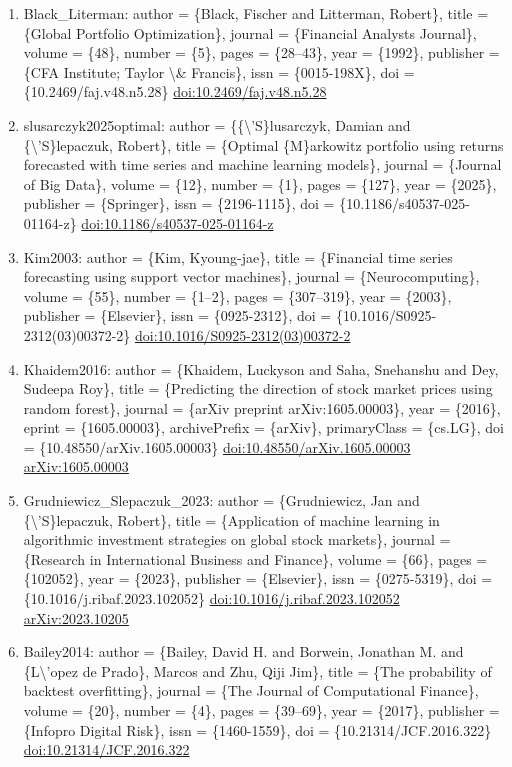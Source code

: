 \documentclass[11pt]{article}
\begin{document}
\begin{enumerate}[leftmargin=*]
  \item Black\_Literman: author = \{Black, Fischer and Litterman, Robert\}, title = \{Global Portfolio Optimization\}, journal = \{Financial Analysts Journal\}, volume = \{48\}, number = \{5\}, pages = \{28--43\}, year = \{1992\}, publisher = \{CFA Institute; Taylor \textbackslash{}\& Francis\}, issn = \{0015-198X\}, doi = \{10.2469/faj.v48.n5.28\} \href{https://doi.org/10.2469/faj.v48.n5.28}{doi:10.2469/faj.v48.n5.28}
  \item slusarczyk2025optimal: author = \{\{\textbackslash{}'S\}lusarczyk, Damian and \{\textbackslash{}'S\}lepaczuk, Robert\}, title = \{Optimal \{M\}arkowitz portfolio using returns forecasted with time series and machine learning models\}, journal = \{Journal of Big Data\}, volume = \{12\}, number = \{1\}, pages = \{127\}, year = \{2025\}, publisher = \{Springer\}, issn = \{2196-1115\}, doi = \{10.1186/s40537-025-01164-z\} \href{https://doi.org/10.1186/s40537-025-01164-z}{doi:10.1186/s40537-025-01164-z}
  \item Kim2003: author = \{Kim, Kyoung-jae\}, title = \{Financial time series forecasting using support vector machines\}, journal = \{Neurocomputing\}, volume = \{55\}, number = \{1--2\}, pages = \{307--319\}, year = \{2003\}, publisher = \{Elsevier\}, issn = \{0925-2312\}, doi = \{10.1016/S0925-2312(03)00372-2\} \href{https://doi.org/10.1016/S0925-2312(03)00372-2}{doi:10.1016/S0925-2312(03)00372-2}
  \item Khaidem2016: author = \{Khaidem, Luckyson and Saha, Snehanshu and Dey, Sudeepa Roy\}, title = \{Predicting the direction of stock market prices using random forest\}, journal = \{arXiv preprint arXiv:1605.00003\}, year = \{2016\}, eprint = \{1605.00003\}, archivePrefix = \{arXiv\}, primaryClass = \{cs.LG\}, doi = \{10.48550/arXiv.1605.00003\} \href{https://doi.org/10.48550/arXiv.1605.00003}{doi:10.48550/arXiv.1605.00003} \href{https://arxiv.org/abs/1605.00003}{arXiv:1605.00003}
  \item Grudniewicz\_Slepaczuk\_2023: author = \{Grudniewicz, Jan and \{\textbackslash{}'S\}lepaczuk, Robert\}, title = \{Application of machine learning in algorithmic investment strategies on global stock markets\}, journal = \{Research in International Business and Finance\}, volume = \{66\}, pages = \{102052\}, year = \{2023\}, publisher = \{Elsevier\}, issn = \{0275-5319\}, doi = \{10.1016/j.ribaf.2023.102052\} \href{https://doi.org/10.1016/j.ribaf.2023.102052}{doi:10.1016/j.ribaf.2023.102052} \href{https://arxiv.org/abs/2023.10205}{arXiv:2023.10205}
  \item Bailey2014: author = \{Bailey, David H. and Borwein, Jonathan M. and \{L\textbackslash{}'opez de Prado\}, Marcos and Zhu, Qiji Jim\}, title = \{The probability of backtest overfitting\}, journal = \{The Journal of Computational Finance\}, volume = \{20\}, number = \{4\}, pages = \{39--69\}, year = \{2017\}, publisher = \{Infopro Digital Risk\}, issn = \{1460-1559\}, doi = \{10.21314/JCF.2016.322\} \href{https://doi.org/10.21314/JCF.2016.322}{doi:10.21314/JCF.2016.322}

\end{enumerate}
\end{document}
